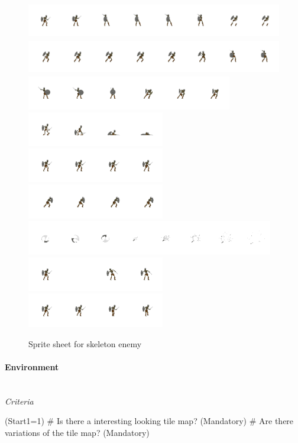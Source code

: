 \documentclass{article}
\newcommand{\myparagraph}[1]{\paragraph{#1}\mbox{}\\} %
\begin{document}
\begin{figure}[H]
\centering
\includegraphics[height = 1.5cm]{skeleton_Attack}
\includegraphics[height = 1.5cm]{skeleton_Attack2}
\includegraphics[height = 1.5cm]{skeleton_Attack3}
\includegraphics[height = 1.5cm]{skeleton_Death}
\includegraphics[height = 1.5cm]{skeleton_Idle}
\includegraphics[height = 1.5cm]{skeleton_Shield}
\includegraphics[height = 1.5cm]{skeleton_Sword_sprite}
\includegraphics[height = 1.5cm]{skeleton_Take Hit}
\includegraphics[height = 1.5cm]{skeleton_Walk}
\caption{Sprite sheet for skeleton enemy}
\label{skeleton_sprite}
\end{figure}

\myparagraph{Environment}
\textit{Criteria}
\begin{easylist}
\ListProperties(Start1=1)
# Is there a interesting looking tile map? (Mandatory)
# Are there variations of the tile map? (Mandatory)
\end{easylist}
\end{document}
